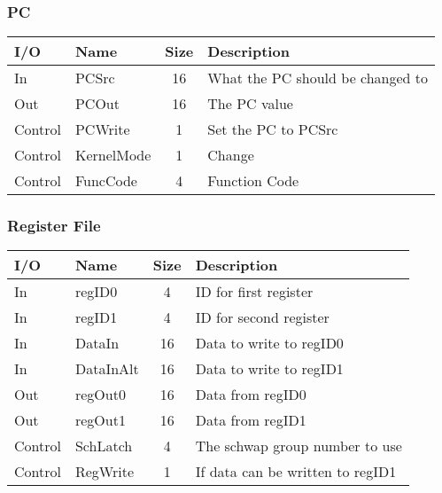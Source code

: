 		\subsubsection{PC}
			\begin{center} \begin{tabular}{| l | l | c | l |} \hline
				I/O & Name      & Size & Description \\ \hline
				In  & PCSrc     & 16   & What the PC should be changed to \\ \hline
				Out & PCOut     & 16   & The PC value \\ \hline
				Control&PCWrite & 1    & Set the PC to PCSrc \\ \hline
				Control&KernelMode& 1  & Change \\ \hline
				Control&FuncCode& 4    & Function Code \\ \hline
			\end{tabular} \end{center}
		\subsubsection{Register File}
			\begin{center} \begin{tabular}{| l | l | c | l |} \hline
				I/O & Name       & Size & Description \\ \hline
				In  & regID0     & 4    & ID for first register \\ \hline
				In  & regID1     & 4    & ID for second register \\ \hline
				In  & DataIn     & 16   & Data to write to regID0 \\ \hline
				In  & DataInAlt  & 16   & Data to write to regID1 \\ \hline
				Out & regOut0    & 16   & Data from regID0 \\ \hline
				Out & regOut1    & 16   & Data from regID1 \\ \hline
				Control & SchLatch & 4  & The schwap group number to use\\ \hline
				Control & RegWrite & 1  & If data can be written to regID1\\ \hline
			\end{tabular} \end{center}
